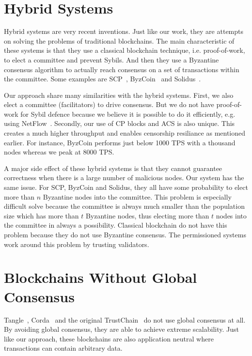 \section{Hybrid Systems}
Hybrid systems are very recent inventions.
Just like our work, they are attempts on solving the problems of traditional blockchains.
The main characteristic of these systems is that they use a classical blockchain technique,
i.e. proof-of-work, to elect a committee and prevent Sybils.
And then they use a Byzantine consensus algorithm to actually reach consensus on a set of transactions within the committee.
Some examples are SCP~\cite{luu2015scp}, ByzCoin~\cite{kogias2016enhancing} and Solidus~\cite{abraham2016solidus}.

Our approach share many similarities with the hybrid systems.
First, we also elect a committee (facilitators) to drive consensus.
But we do not have proof-of-work for Sybil defence because we believe 
it is possible to do it efficiently, e.g. using NetFlow~\cite{pimotte}.
Secondly, our use of CP blocks and ACS is also unique.
This creates a much higher throughput and enables censorship resiliance as mentioned earlier.
For instance, ByzCoin performs just below 1000 TPS with a thousand nodes whereas we peak at 8000 TPS.

A major side effect of these hybrid systems is that they cannot guarantee correctness when there is a large number of malicious nodes.
Our system has the same issue.
For SCP, ByzCoin and Solidus, they all have some probability to elect more than $n$ Byzantine nodes into the committee.
This problem is especially difficult solve because the committee is always much smaller than the population size which has more than $t$ Byzantine nodes,
thus electing more than $t$ nodes into the committee in always a possibility.
Classical blockchain do not have this problem because they do not use Byzantine consensus.
The permissioned systems work around this problem by trusting validators.

\section{Blockchains Without Global Consensus}

Tangle~\cite{tangle}, Corda~\cite{corda} and the original TrustChain~\cite{trustchain} do not use global consensus at all.
By avoiding global consensus, they are able to achieve extreme scalability.
Just like our approach, these blockchains are also application neutral where transactions can contain arbitrary data.

